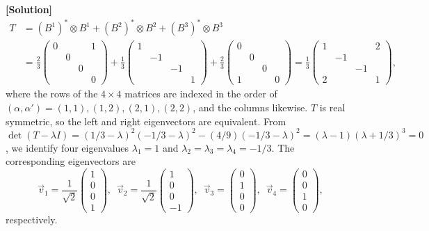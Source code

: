 \documentclass[11pt,a4paper,oneside]{article}
\begin{document}
\begin{enumerate}[(a)]
\textbf{[Solution]}
\begin{equation}
\begin{aligned}
T &=
(B^1)^* \otimes B^1 +
(B^2)^* \otimes B^2 +
(B^3)^* \otimes B^3
\\
&=
\frac{2}{3}
\begin{pmatrix}
0 & & & 1 \\
& 0 & & \\
& & 0 & \\
& & & 0
\end{pmatrix}
+
\frac{1}{3}
\begin{pmatrix}
1 & & & \\
& -1 & & \\
& & -1 & \\
& & & 1
\end{pmatrix}
+
\frac{2}{3}
\begin{pmatrix}
0 & & & \\
& 0 & & \\
& & 0 & \\
1 & & & 0
\end{pmatrix}
=
\frac{1}{3}
\begin{pmatrix}
1 & & & 2 \\
& -1 & & \\
& & -1 & \\
2 & & & 1
\end{pmatrix},
\end{aligned}
\end{equation}
where the rows of the $4\times 4$ matrices are indexed in the order of $(\alpha, \alpha') = (1, 1), (1, 2), (2,1), (2,2)$, and the columns likewise.
$T$ is real symmetric, so the left and right eigenvectors are equivalent.
From $\det (T - \lambda I) = (1/3-\lambda)^2 (-1/3-\lambda)^2 - (4/9)(-1/3-\lambda)^2 = 
(\lambda -1) (\lambda + 1/3)^3 = 0$,
we identify four eigenvalues $\lambda_1 = 1$ and $\lambda_2 = \lambda_3 = \lambda_4 = -1/3$.
The corresponding eigenvectors are
\begin{equation}
\vec{v}_1 = \frac{1}{\sqrt{2}}
\begin{pmatrix}
1 \\ 0 \\ 0 \\ 1
\end{pmatrix},
\,\,\,
\vec{v}_2 = \frac{1}{\sqrt{2}}
\begin{pmatrix}
1 \\ 0 \\ 0 \\ -1
\end{pmatrix},
\,\,\,
\vec{v}_3 = 
\begin{pmatrix}
0 \\ 1 \\ 0 \\ 0
\end{pmatrix},
\,\,\,
\vec{v}_4 = 
\begin{pmatrix}
0 \\ 0 \\ 1 \\ 0
\end{pmatrix},
\end{equation}
respectively.



\end{enumerate}
\end{document}
